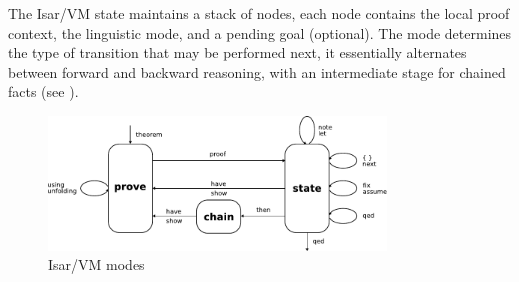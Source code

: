 \begin{isabellebody}
\begin{isamarkuptext}
  \medskip The Isar/VM state maintains a stack of nodes, each node
  contains the local proof context, the linguistic mode, and a pending
  goal (optional).  The mode determines the type of transition that
  may be performed next, it essentially alternates between forward and
  backward reasoning, with an intermediate stage for chained facts
  (see ).

  \begin{figure}[htb]
  \begin{center}
  \includegraphics[width=0.8\textwidth]{Thy/document/isar-vm}
  \end{center}
  \caption{Isar/VM modes}\label{fig:isar-vm}
  \end{figure}


\end{isamarkuptext}
\end{isabellebody}
